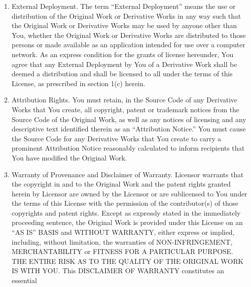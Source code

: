 \documentclass[11pt]{book}
\begin{document}
\begin{enumerate}[1)]
grant any rights to trademarks, copyrights, patents, trade secrets or
any other intellectual property of Licensor except as expressly stated
herein. No patent license is granted to make, use, sell or offer to
sell embodiments of any patent claims other than the licensed claims
defined in Section 2. No right is granted to the trademarks of
Licensor even if such marks are included in the Original Work. Nothing
in this License shall be interpreted to prohibit Licensor from
licensing under different terms from this License any Original Work
that Licensor otherwise would have a right to license.
\item
External Deployment. The term ``External Deployment'' means the use or
distribution of the Original Work or Derivative Works in any way such
that the Original Work or Derivative Works may be used by anyone other
than You, whether the Original Work or Derivative Works are
distributed to those persons or made available as an application
intended for use over a computer network. As an express condition for
the grants of license hereunder, You agree that any External
Deployment by You of a Derivative Work shall be deemed a distribution
and shall be licensed to all under the terms of this License, as
prescribed in section 1(c) herein.
\item
Attribution Rights. You must retain, in the Source Code of any
Derivative Works that You create, all copyright, patent or trademark
notices from the Source Code of the Original Work, as well as any
notices of licensing and any descriptive text identified therein as an
``Attribution Notice.'' You must cause the Source Code for any
Derivative Works that You create to carry a prominent Attribution
Notice reasonably calculated to inform recipients that You have
modified the Original Work.
\item
Warranty of Provenance and Disclaimer of Warranty. Licensor warrants
that the copyright in and to the Original Work and the patent rights
granted herein by Licensor are owned by the Licensor or are
sublicensed to You under the terms of this License with the permission
of the contributor(s) of those copyrights and patent rights. Except as
expressly stated in the immediately proceeding sentence, the Original
Work is provided under this License on an ``AS IS'' BASIS and WITHOUT
WARRANTY, either express or implied, including, without limitation,
the warranties of NON-INFRINGEMENT, MERCHANTABILITY or FITNESS FOR A
PARTICULAR PURPOSE. THE ENTIRE RISK AS TO THE QUALITY OF THE ORIGINAL
WORK IS WITH YOU. This DISCLAIMER OF WARRANTY constitutes an essential

\end{enumerate}
\end{document}
